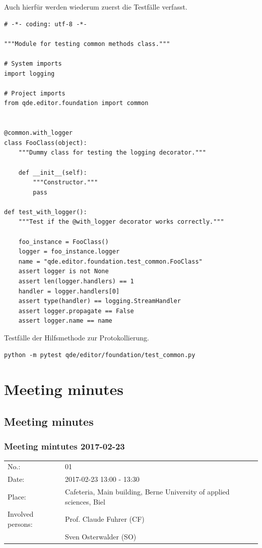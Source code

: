 \documentclass[10pt, openright, notitlepage]{scrreprt}
\begin{document}
Auch hierfür werden wiederum zuerst die Testfälle verfasst.

\begin{listing}[H]
\begin{verbatim}
# -*- coding: utf-8 -*-

"""Module for testing common methods class."""

# System imports
import logging

# Project imports
from qde.editor.foundation import common


@common.with_logger
class FooClass(object):
    """Dummy class for testing the logging decorator."""

    def __init__(self):
        """Constructor."""
        pass

def test_with_logger():
    """Test if the @with_logger decorator works correctly."""

    foo_instance = FooClass()
    logger = foo_instance.logger
    name = "qde.editor.foundation.test_common.FooClass"
    assert logger is not None
    assert len(logger.handlers) == 1
    handler = logger.handlers[0]
    assert type(handler) == logging.StreamHandler
    assert logger.propagate == False
    assert logger.name == name
\end{verbatim}
\caption{\label{fig:editor-common-logging-test}
Testfälle der Hilfsmethode zur Protokollierung.}
\end{listing}

\begin{verbatim}
python -m pytest qde/editor/foundation/test_common.py
\end{verbatim}
\section{Meeting minutes}
\label{sec:org1e08a01}
\subsection{Meeting minutes}
\label{sec:org8fccf4d}

\subsubsection{Meeting mintutes 2017-02-23}
\label{sec:orgc4510c6}

\begin{center}
\begin{tabular}{ll}
No.: & 01\\
Date: & 2017-02-23 13:00 - 13:30\\
Place: & Cafeteria, Main building, Berne University of applied sciences, Biel\\
Involved persons: & Prof. Claude Fuhrer (CF)\\
 & Sven Osterwalder (SO)\\
\end{tabular}
\end{center}
\end{document}
